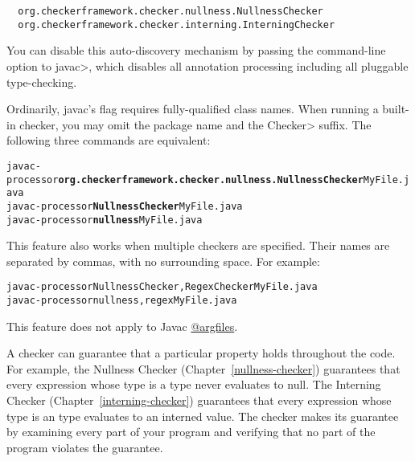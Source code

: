 \begin{smaller}
\begin{Verbatim}
  org.checkerframework.checker.nullness.NullnessChecker
  org.checkerframework.checker.interning.InterningChecker
\end{Verbatim}
\end{smaller}

You can disable this auto-discovery mechanism by passing the
 command-line option to \<javac>, which disables all
annotation processing including all pluggable type-checking.




Ordinarily, javac's  flag requires fully-qualified class names.
When running a built-in checker, you may
omit the package name and the \<Checker> suffix.
The following three commands are equivalent:

\begin{alltt}
  javac -processor \textbf{org.checkerframework.checker.nullness.NullnessChecker} MyFile.java
  javac -processor \textbf{NullnessChecker} MyFile.java
  javac -processor \textbf{nullness} MyFile.java
\end{alltt}

This feature also works when multiple checkers are specified.
Their names are separated by commas, with no surrounding space.
For example:

\begin{alltt}
  javac -processor NullnessChecker,RegexChecker MyFile.java
  javac -processor nullness,regex MyFile.java
\end{alltt}

This feature does not apply to Javac \href{https://docs.oracle.com/javase/7/docs/technotes/tools/windows/javac.html#commandlineargfile}{@argfiles}.



A checker can guarantee that a particular property holds throughout the
code.  For example, the Nullness Checker (Chapter~\ref{nullness-checker})
guarantees that every expression whose type is a  type never
evaluates to null.  The Interning Checker (Chapter~\ref{interning-checker})
guarantees that every expression whose type is an  type
evaluates to an interned value.  The checker makes its guarantee by
examining every part of your program and verifying that no part of the
program violates the guarantee.

